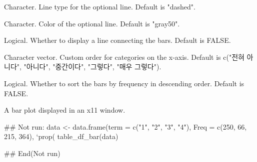 \documentclass[a4paper]{book}
\begin{document}
\begin{Arguments}
\begin{ldescription}
\item[\code{linetype}] Character. Line type for the optional line. Default is "dashed".

\item[\code{linecolor}] Character. Color of the optional line. Default is "gray50".

\item[\code{show\_line}] Logical. Whether to display a line connecting the bars. Default is FALSE.

\item[\code{levels}] Character vector. Custom order for categories on the x-axis. Default is c("전혀 아니다", "아니다", "중간이다", "그렇다", "매우 그렇다").

\item[\code{sort}] Logical. Whether to sort the bars by frequency in descending order. Default is FALSE.
\end{ldescription}
\end{Arguments}
%
\begin{Value}
A bar plot displayed in an x11 window.
\end{Value}
%
\begin{Examples}
\begin{ExampleCode}
\#\# Not run: 
data <- data.frame(term = c("1", "2", "3", "4"), Freq = c(250, 66, 215, 364),
                   `prop(%
table_df_bar(data)

## End(Not run)
\end{ExampleCode}
\end{Examples}
\end{document}
